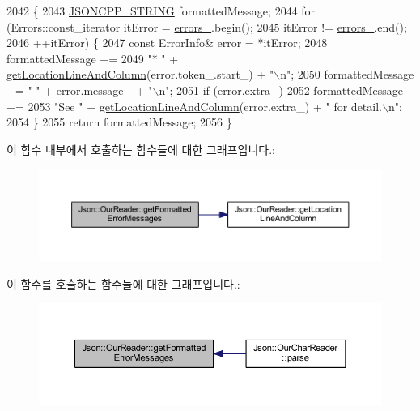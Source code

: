 \begin{DoxyCode}
2042                                                           \{
2043   \hyperlink{json-forwards_8h_a1e723f95759de062585bc4a8fd3fa4be}{JSONCPP\_STRING} formattedMessage;
2044   \textcolor{keywordflow}{for} (Errors::const\_iterator itError = \hyperlink{class_json_1_1_our_reader_afb76b68ba1ab68fe09cf2838e3d4898d}{errors\_}.begin();
2045        itError != \hyperlink{class_json_1_1_our_reader_afb76b68ba1ab68fe09cf2838e3d4898d}{errors\_}.end();
2046        ++itError) \{
2047     \textcolor{keyword}{const} ErrorInfo& error = *itError;
2048     formattedMessage +=
2049         \textcolor{stringliteral}{"* "} + \hyperlink{class_json_1_1_our_reader_af482c8e718615646e13a996292e18d74}{getLocationLineAndColumn}(error.token\_.start\_) + \textcolor{stringliteral}{"\(\backslash\)n"};
2050     formattedMessage += \textcolor{stringliteral}{"  "} + error.message\_ + \textcolor{stringliteral}{"\(\backslash\)n"};
2051     \textcolor{keywordflow}{if} (error.extra\_)
2052       formattedMessage +=
2053           \textcolor{stringliteral}{"See "} + \hyperlink{class_json_1_1_our_reader_af482c8e718615646e13a996292e18d74}{getLocationLineAndColumn}(error.extra\_) + \textcolor{stringliteral}{" for detail.\(\backslash\)n"};
2054   \}
2055   \textcolor{keywordflow}{return} formattedMessage;
2056 \}
\end{DoxyCode}
이 함수 내부에서 호출하는 함수들에 대한 그래프입니다.\+:\nopagebreak
\begin{figure}[H]
\begin{center}
\leavevmode
\includegraphics[width=350pt]{class_json_1_1_our_reader_a7971de51d73bb4aee5b0c4742c4aaaac_cgraph}
\end{center}
\end{figure}
이 함수를 호출하는 함수들에 대한 그래프입니다.\+:\nopagebreak
\begin{figure}[H]
\begin{center}
\leavevmode
\includegraphics[width=350pt]{class_json_1_1_our_reader_a7971de51d73bb4aee5b0c4742c4aaaac_icgraph}
\end{center}
\end{figure}
\mbox{\label{class_json_1_1_our_reader_af482c8e718615646e13a996292e18d74}} 
